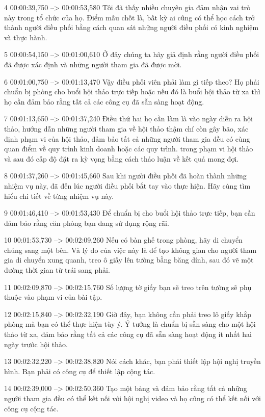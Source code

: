 4
00:00:39,750 --> 00:00:53,580
Tôi đã thấy nhiều chuyên gia đảm nhận vai trò này trong tổ chức của họ.  Điểm mấu chốt là, bất kỳ ai cũng có thể học cách trở thành người điều phối bằng cách quan sát những người điều phối có kinh nghiệm và thực hành.

5
00:00:54,150 --> 00:01:00,610
Ở đây chúng ta hãy giả định rằng người điều phối đã được xác định và những người tham gia đã được mời.

6
00:01:00,750 --> 00:01:13,470
Vậy điều phối viên phải làm gì tiếp theo?  Họ phải chuẩn bị phòng cho buổi hội thảo trực tiếp hoặc nếu đó là buổi hội thảo từ xa thì họ cần đảm bảo rằng tất cả các công cụ đã sẵn sàng hoạt động.

7
00:01:13,650 --> 00:01:37,240
Điều thứ hai họ cần làm là vào ngày diễn ra hội thảo, hướng dẫn những người tham gia về hội thảo thậm chí còn gây bão, xác định phạm vi của hội thảo, đảm bảo tất cả những người tham gia đều có cùng quan điểm về quy trình kinh doanh hoặc các quy trình.  trong phạm vi hội thảo và sau đó cấp độ đặt ra kỳ vọng bằng cách thảo luận về kết quả mong đợi.

8
00:01:37,260 --> 00:01:45,660
Sau khi người điều phối đã hoàn thành những nhiệm vụ này, đã đến lúc người điều phối bắt tay vào thực hiện. Hãy cùng tìm hiểu chi tiết về từng nhiệm vụ này.

9
00:01:46,410 --> 00:01:53,430
Để chuẩn bị cho buổi hội thảo trực tiếp, bạn cần đảm bảo rằng căn phòng bạn đang sử dụng rộng rãi.

10
00:01:53,730 --> 00:02:09,260
Nếu có bàn ghế trong phòng, hãy di chuyển chúng sang một bên.  Và lý do của việc này là để tạo không gian cho người tham gia di chuyển xung quanh, treo ô giấy lên tường bằng băng dính, sau đó vẽ một đường thời gian từ trái sang phải.

11
00:02:09,870 --> 00:02:15,760
Số lượng tờ giấy bạn sẽ treo trên tường sẽ phụ thuộc vào phạm vi của bài tập.

12
00:02:15,840 --> 00:02:32,190
Giờ đây, bạn không cần phải treo lô giấy khắp phòng mà bạn có thể thực hiện tùy ý.  Ý tưởng là chuẩn bị sẵn sàng cho một hội thảo từ xa, đảm bảo rằng tất cả các công cụ đã sẵn sàng hoạt động ít nhất hai ngày trước hội thảo.

13
00:02:32,220 --> 00:02:38,820
Nói cách khác, bạn phải thiết lập hội nghị truyền hình.  Bạn phải có công cụ để thiết lập cộng tác.

14
00:02:39,000 --> 00:02:50,360
Tạo một bảng và đảm bảo rằng tất cả những người tham gia đều có thể kết nối với hội nghị video và họ cũng có thể kết nối với công cụ cộng tác.

